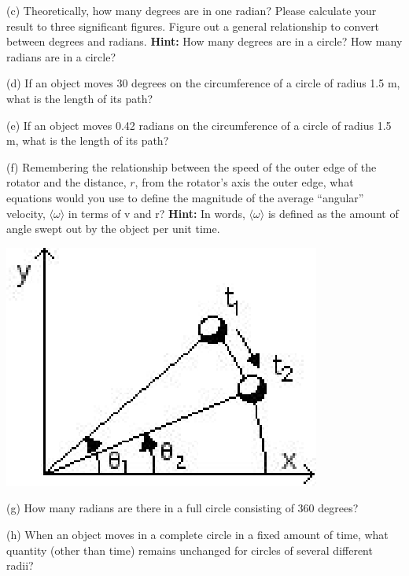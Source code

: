 (c) Theoretically, how many degrees are in one radian? Please calculate your
result to three significant figures. Figure out a general relationship to convert between degrees and radians. \textbf{Hint:} How many degrees are in a circle?  How many radians are in a circle?
\answerspace{20mm}

(d) If an object moves 30 degrees on the circumference of a circle of radius
1.5 m, what is the length of its path?
\answerspace{20mm}

(e) If an object moves 0.42 radians on the circumference of a circle of radius
1.5 m, what is the length of its path?
\answerspace{20mm}

\pagebreak[2]

(f) Remembering the relationship between the speed of the outer edge of the
rotator and the distance, $r$, 
from the rotator's axis the outer edge, what equations
would you use to define the magnitude of the average ``angular''
velocity, \( \langle\omega \rangle \) in terms of v and r? \textbf{Hint:} In words, 
\( \langle\omega \rangle \) is defined
as the amount of angle swept out by the object per unit time. 

\vspace{0.3cm}
{\par\raggedright \includegraphics{rotation/rotation_fig8.eps} \par}
\vspace{0.3cm}

(g) How many radians are there in a full circle consisting of 360 degrees?
\vspace{10mm}

(h) When an object moves in a complete circle in a fixed amount of time, what
quantity (other than time) remains unchanged for circles of several different
radii? 
\vspace{10mm}

